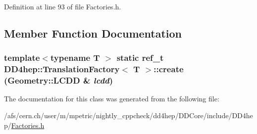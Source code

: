 Definition at line 93 of file Factories.h.

\subsection{Member Function Documentation}
\hypertarget{class_d_d4hep_1_1_translation_factory_a9a32f69ddecbefc80fbeeb1c4a22624b}{
\subsubsection[{create}]{\setlength{\rightskip}{0pt plus 5cm}template$<$typename T $>$ static {\bf ref\_\-t} {\bf DD4hep::TranslationFactory}$<$ {\bf T} $>$::create ({\bf Geometry::LCDD} \& {\em lcdd})}}
\label{class_d_d4hep_1_1_translation_factory_a9a32f69ddecbefc80fbeeb1c4a22624b}


The documentation for this class was generated from the following file:\begin{DoxyCompactItemize}
\item 
/afs/cern.ch/user/m/mpetric/nightly\_\-cppcheck/dd4hep/DDCore/include/DD4hep/\hyperlink{_d_d_core_2include_2_d_d4hep_2_factories_8h}{Factories.h}\end{DoxyCompactItemize}
